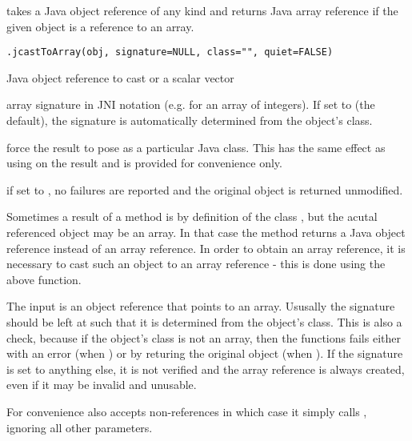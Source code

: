 \begin{Description}\relax
{} takes a Java object reference of any kind and
returns Java array reference if the given object is a reference to an
array.
\end{Description}
\begin{Usage}
\begin{verbatim}
.jcastToArray(obj, signature=NULL, class="", quiet=FALSE)
\end{verbatim}
\end{Usage}
\begin{Arguments}
\begin{ldescription}
\item[\code{obj}] Java object reference to cast or a scalar vector
\item[\code{signature}] array signature in JNI notation (e.g. \code{"[I"} for
an array of integers). If set to  (the default),
the signature is automatically determined from the object's class.
\item[\code{class}] force the result to pose as a particular Java
class. This has the same effect as using  on the
result and is provided for convenience only.
\item[\code{quiet}] if set to , no failures are reported and the
original object is returned unmodified.
\end{ldescription}
\end{Arguments}
\begin{Details}\relax
Sometimes a result of a method is by definition of the class
, but the acutal referenced object may be an
array. In that case the method returns a Java object reference instead
of an array reference. In order to obtain an array reference, it is
necessary to cast such an object to an array reference - this is done
using the above  function.

The input is an object reference that points to an array. Ususally the
signature should be left at  such that it is determined
from the object's class. This is also a check, because if the object's
class is not an array, then the functions fails either with an error
(when ) or by returing the original object (when
). If the signature is set to anything else, it is
not verified and the array reference is always created, even if it may
be invalid and unusable.

For convenience  also accepts non-references in
which case it simply calls , ignoring all other
parameters.
\end{Details}
